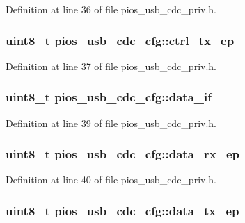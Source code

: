 \-Definition at line 36 of file pios\-\_\-usb\-\_\-cdc\-\_\-priv.\-h.

\hypertarget{structpios__usb__cdc__cfg_a66e87c604aa767dc74141a0b7e7e3b7f}{
\subsubsection[{ctrl\-\_\-tx\-\_\-ep}]{\setlength{\rightskip}{0pt plus 5cm}uint8\-\_\-t {\bf pios\-\_\-usb\-\_\-cdc\-\_\-cfg\-::ctrl\-\_\-tx\-\_\-ep}}}\label{structpios__usb__cdc__cfg_a66e87c604aa767dc74141a0b7e7e3b7f}


\-Definition at line 37 of file pios\-\_\-usb\-\_\-cdc\-\_\-priv.\-h.

\hypertarget{structpios__usb__cdc__cfg_a6812747b57d5aa880ba1c3bde8f6333c}{
\subsubsection[{data\-\_\-if}]{\setlength{\rightskip}{0pt plus 5cm}uint8\-\_\-t {\bf pios\-\_\-usb\-\_\-cdc\-\_\-cfg\-::data\-\_\-if}}}\label{structpios__usb__cdc__cfg_a6812747b57d5aa880ba1c3bde8f6333c}


\-Definition at line 39 of file pios\-\_\-usb\-\_\-cdc\-\_\-priv.\-h.

\hypertarget{structpios__usb__cdc__cfg_a93c34c9365c4f3593572f3c75039dc3c}{
\subsubsection[{data\-\_\-rx\-\_\-ep}]{\setlength{\rightskip}{0pt plus 5cm}uint8\-\_\-t {\bf pios\-\_\-usb\-\_\-cdc\-\_\-cfg\-::data\-\_\-rx\-\_\-ep}}}\label{structpios__usb__cdc__cfg_a93c34c9365c4f3593572f3c75039dc3c}


\-Definition at line 40 of file pios\-\_\-usb\-\_\-cdc\-\_\-priv.\-h.

\hypertarget{structpios__usb__cdc__cfg_a00440e0eaec6a2c120fd8909599e8f61}{
\subsubsection[{data\-\_\-tx\-\_\-ep}]{\setlength{\rightskip}{0pt plus 5cm}uint8\-\_\-t {\bf pios\-\_\-usb\-\_\-cdc\-\_\-cfg\-::data\-\_\-tx\-\_\-ep}}}\label{structpios__usb__cdc__cfg_a00440e0eaec6a2c120fd8909599e8f61}


